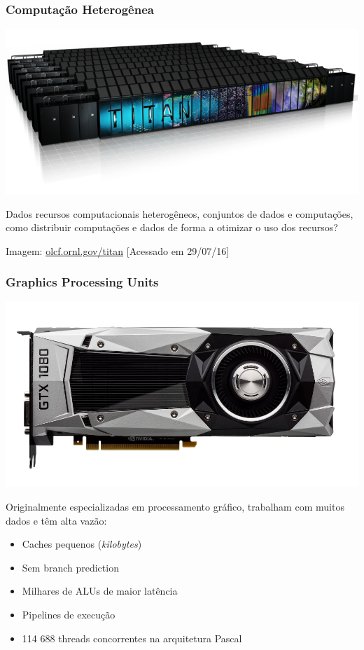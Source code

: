 \documentclass[10pt, compress]{beamer}
\begin{document}
\begin{frame}
    \frametitle{Computação Heterogênea}
    \begin{center}
        \includegraphics[width=.7\textwidth]{titan}
    \end{center}

    Dados recursos computacionais \alert{heterogêneos}, conjuntos de
    \alert{dados} e \alert{computações}, como distribuir computações e dados de
    forma a \alert{otimizar o uso} dos recursos?
    \hfill

    \begin{center}
    \tiny{Imagem: \url{olcf.ornl.gov/titan} [Acessado em 29/07/16]}
    \end{center}
\end{frame}

\begin{frame}
    \frametitle{Graphics Processing Units}
    \begin{center}
        \includegraphics[width=.6\textwidth]{gtx1080}
    \end{center}

    Originalmente especializadas em \alert{processamento gráfico},
    trabalham com muitos dados e têm \alert{alta vazão}:
    \begin{itemize}
        \item Caches pequenos (\textit{kilobytes})
        \item Sem \alert{branch prediction}
        \item \alert{Milhares} de ALUs de \alert{maior latência}
        \item \alert{Pipelines} de execução
        \item 114 688 \alert{threads} concorrentes na arquitetura Pascal
    \end{itemize}
\end{frame}
\end{document}
